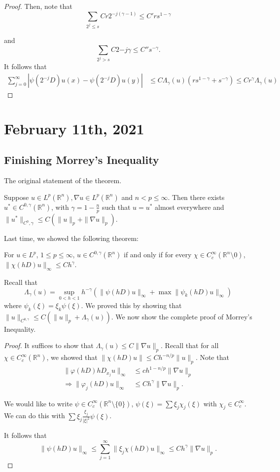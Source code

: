 \documentclass[12pt]{scrartcl}
\newcommand{\R}{\mathbb{R}}
\newcommand{\<}{\langle}
\renewcommand{\>}{\rangle}
\let \phi \varphi
\let \grad \nabla
\begin{document}
\begin{proof}
Then, note that 
$$ \sum_{2^j \le s} Cr2^{-j(\gamma - 1)} \le C' r  s^{1-\gamma}$$

and 
$$\sum_{2^j > s} C2{-j\gamma} \le C'' s^{-\gamma}.$$
It follows that 
\begin{align*}
\sum_{j=0}^\infty |\psi(2^{-j}D)u(x) - \psi(2^{-j}D)u(y)| &\le C\Lambda_\gamma(u)(rs^{1 - \gamma} + s^{-\gamma}) \le Cr^\gamma\Lambda_\gamma(u) 
\end{align*}
\end{proof}
\pagebreak
\section{February 11th, 2021}
\subsection{Finishing Morrey's Inequality}
The original statement of the theorem.
\begin{thm}  Suppose $u \in L^p(\R^n), \grad u \in L^p(\R^n)$ and $n < p \le \infty$.  Then there exists $u^* \in C^{0, \gamma}(\R^n)$, with $\gamma = 1 - \frac{n}{p}$ such that $u = u^*$ almost everywhere and $\|u^*\|_{C^0, \gamma} \le C(\|u\|_p + \|\grad u\|_{p})$.
\end{thm}
Last time, we showed the following theorem:
\begin{thm} For $u \in L^p$, $1\le p \le \infty$, $u \in C^{0, \gamma}(\R^n)$ if and only if for every $\chi \in C_c^\infty(\R^n \setminus 0)$, $\|\chi(hD) u\|_\infty \le C h^{\gamma}$.
\end{thm}
Recall that
$$\Lambda_\gamma(u) = \sup_{0 < h < 1} h^{-\gamma}(\| \psi(hD)u\|_\infty + \max \| \psi_k(hD)u\|_\infty)$$
where $\psi_k(\xi) = \xi_k \psi(\xi)$.  
We proved this by showing that $\|u\|_{C^{0, \gamma}} \le C(\|u\|_p + \Lambda_\gamma(u))$.  We now show the complete proof of Morrey's Inequality.
\begin{proof}
It suffices to show that $\Lambda_\gamma(u) \le C\|\grad u\|_p$.  Recall that for all $\chi \in C_c^\infty(\R^n)$, we showed that $\|\chi(hD)u\|\le  Ch^{-n/p}\|u\|_p$.  Note that 
\begin{align*}
\|\phi(hD)hD_{x_j}u\|_\infty &\le ch^{1-n/p} \|\grad u\|_p \\
\Rightarrow \| \phi_j(hD)u\|_\infty &\le Ch^\gamma \|\grad u\|_p.
\end{align*}

We would like to write $\psi \in C_c^\infty(\R^n\setminus \{0\})$, $\psi(\xi) = \sum \xi_j \chi_j(\xi)$ with $\chi_j \in C_c^\infty$.  We can do this with $\sum \xi_j \frac{\xi_j}{|\xi|^2}\psi(\xi)$.

It follows that 
$$\|\psi(hD)u\|_\infty \le \sum_{j=1}^\infty \|\xi_j \chi(hD) u\|_\infty \le Ch^\gamma \|\grad u\|_p.$$
\end{proof}
\end{document}
